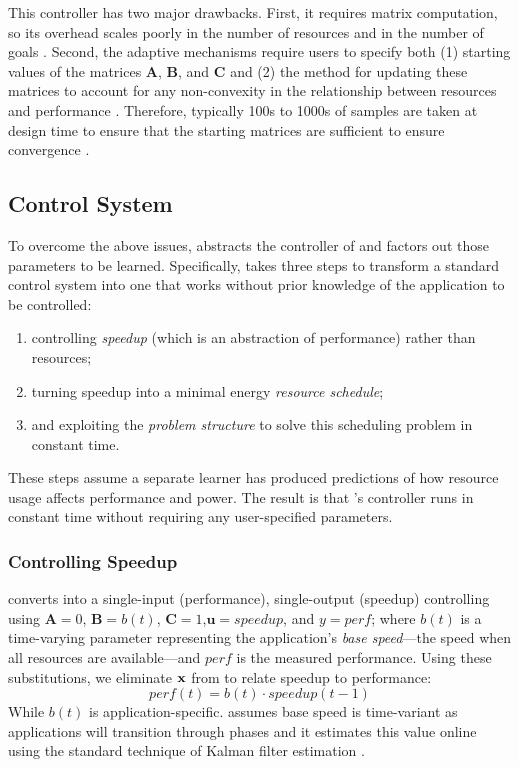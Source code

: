 This controller has two major drawbacks.  First, it requires matrix
computation, so its overhead scales poorly in the number of resources
and in the number of goals \cite{Hellerstein2004a,METE}.  Second, the
adaptive mechanisms require users to specify both (1) starting values
of the matrices $\mathbf{A}$, $\mathbf{B}$, and $\mathbf{C}$ and (2)
the method for updating these matrices to account for any
non-convexity in the relationship between resources and performance
\cite{POET,METE,ControlWare,HandbookControl}.  Therefore, typically
100s to 1000s of samples are taken at design time to ensure that the
starting matrices are sufficient to ensure convergence
\cite{FSE2015,sysid,josep-isca2016}.

\subsection{\SYSTEM{} Control System}
To overcome the above issues, \SYSTEM{} abstracts the controller of
 and factors out those parameters to be learned.
Specifically, \SYSTEM{} takes three steps to transform a standard
control system into one that works without prior knowledge of the
application to be controlled:
\begin{enumerate}[leftmargin=1em]
\item controlling \emph{speedup} (which is an abstraction of performance) rather than resources;
\item turning speedup into a minimal energy \emph{resource schedule};
\item and exploiting the \emph{problem structure} to solve this
  scheduling problem in constant time.
\end{enumerate}
These steps assume a separate learner has produced predictions of how
resource usage affects performance and power.  The result is that
\SYSTEM{}'s controller runs in constant time without requiring any
user-specified parameters.



\subsubsection{Controlling Speedup}
\SYSTEM{} converts  into a single-input
(performance), single-output (speedup) controlling using $\mathbf{A} =
0$, $\mathbf{B} = b(t)$, $\mathbf{C} = 1$,$\mathbf{u}= speedup$, and
$y = perf$; where $b(t)$ is a time-varying parameter representing the
application's \emph{base speed}---the speed when all resources are
available---and $perf$ is the measured performance. Using these
substitutions, we eliminate $\mathbf{x}$ from  to relate
speedup to performance:
\begin{equation}
  perf(t) = b(t) \cdot speedup(t-1) \label{eqn:speedup}
\end{equation}
While $b(t)$ is application-specific.  \SYSTEM{} assumes base speed is
time-variant as applications will transition through phases and it
estimates this value online using the standard technique of Kalman
filter estimation \cite{welch2006kalman}. 


